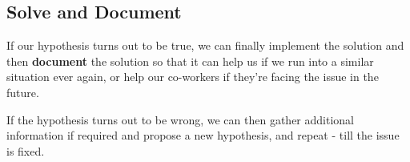 \subsection{Solve and Document}
If our hypothesis turns out to be true, we can finally implement the solution and then \textbf{document} the solution so that it can help us if we run into a similar situation ever again, or help our co-workers if they're facing the issue in the future. 

If the hypothesis turns out to be wrong, we can then gather additional information if required and propose a new hypothesis, and repeat - till the issue is fixed. 
